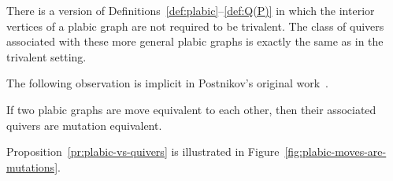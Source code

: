 \begin{remark}
There is a version of Definitions~\ref{def:plabic}--\ref{def:Q(P)} 
in which the interior vertices of a plabic graph are not required to be trivalent. 
The class of quivers associated with these more general plabic graphs 
is exactly the same as in the trivalent setting. 
\end{remark}

The following observation is implicit in Postnikov's original work~\cite{postnikov}.

\begin{proposition} %
\label{pr:plabic-vs-quivers}
If two plabic graphs are move equivalent to each other, 
then their associated quivers are mutation equivalent. 
\end{proposition}

Proposition~\ref{pr:plabic-vs-quivers} is illustrated in 
Figure~\ref{fig:plabic-moves-are-mutations}. 



